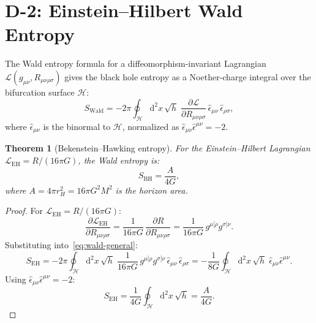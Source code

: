 \documentclass[11pt,a4paper]{article}
\renewcommand{\dd}{\mathrm{d}}
\theoremstyle{plain}
\newtheorem{theorem}{Theorem}[section]
\theoremstyle{definition}
\begin{document}
\section{D-2: Einstein--Hilbert Wald Entropy}
\label{sec:D2}

The Wald entropy formula for a diffeomorphism-invariant Lagrangian
$\mathcal{L}(g_{\mu\nu}, R_{\mu\nu\rho\sigma})$ gives the black hole
entropy as a Noether-charge integral over the bifurcation surface $\mathcal{H}$:
\begin{equation}\label{eq:wald-general}
  S_{\mathrm{Wald}} = -2\pi \oint_{\mathcal{H}} \dd^2 x\,\sqrt{h}\;
  \frac{\partial\mathcal{L}}{\partial R_{\mu\nu\rho\sigma}}\,
  \hat{\epsilon}_{\mu\nu}\,\hat{\epsilon}_{\rho\sigma},
\end{equation}
where $\hat{\epsilon}_{\mu\nu}$ is the binormal to $\mathcal{H}$,
normalized as $\hat{\epsilon}_{\mu\nu}\hat{\epsilon}^{\mu\nu} = -2$.

\begin{theorem}[Bekenstein--Hawking entropy]\label{thm:BH-entropy}
For the Einstein--Hilbert Lagrangian
$\mathcal{L}_{\mathrm{EH}} = R/(16\pi G)$, the Wald entropy is:
\begin{equation}\label{eq:S-BH}
  S_{\mathrm{BH}} = \frac{A}{4G},
\end{equation}
where $A = 4\pi r_H^2 = 16\pi G^2 M^2$ is the horizon area.
\end{theorem}

\begin{proof}
For $\mathcal{L}_{\mathrm{EH}} = R/(16\pi G)$:
\begin{equation}
  \frac{\partial\mathcal{L}_{\mathrm{EH}}}{\partial R_{\mu\nu\rho\sigma}}
  = \frac{1}{16\pi G}\,\frac{\partial R}{\partial R_{\mu\nu\rho\sigma}}
  = \frac{1}{16\pi G}\,g^{\mu[\rho}g^{\sigma]\nu}.
\end{equation}
Substituting into~\eqref{eq:wald-general}:
\begin{equation}
  S_{\mathrm{EH}} = -2\pi\oint_{\mathcal{H}}\dd^2 x\,\sqrt{h}\;
  \frac{1}{16\pi G}\,g^{\mu[\rho}g^{\sigma]\nu}\,
  \hat{\epsilon}_{\mu\nu}\,\hat{\epsilon}_{\rho\sigma}
  = -\frac{1}{8G}\oint_{\mathcal{H}}\dd^2 x\,\sqrt{h}\;
  \hat{\epsilon}_{\mu\nu}\hat{\epsilon}^{\mu\nu}.
\end{equation}
Using $\hat{\epsilon}_{\mu\nu}\hat{\epsilon}^{\mu\nu} = -2$:
\begin{equation}
  S_{\mathrm{EH}} = \frac{1}{4G}\oint_{\mathcal{H}}\dd^2 x\,\sqrt{h}
  = \frac{A}{4G}.
\end{equation}
\end{proof}
\end{document}
